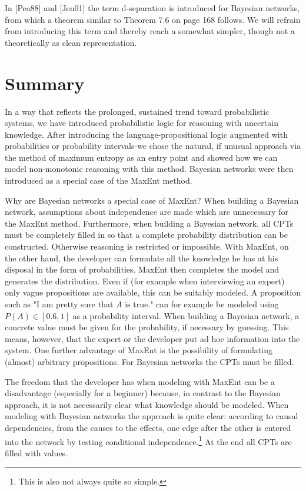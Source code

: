 \documentclass[10pt]{book}
\begin{document}
In [Pea88] and [Jen01] the term d-separation is introduced for Bayesian networks, from which a theorem similar to Theorem 7.6 on page 168 follows. We will refrain from introducing this term and thereby reach a somewhat simpler, though not a theoretically as clean representation.

\section{Summary}
In a way that reflects the prolonged, sustained trend toward probabilistic systems, we have introduced probabilistic logic for reasoning with uncertain knowledge. After introducing the language-propositional logic augmented with probabilities or probability intervals-we chose the natural, if unusual approach via the method of maximum entropy as an entry point and showed how we can model non-monotonic reasoning with this method. Bayesian networks were then introduced as a special case of the MaxEnt method.

Why are Bayesian networks a special case of MaxEnt? When building a Bayesian network, assumptions about independence are made which are unnecessary for the MaxEnt method. Furthermore, when building a Bayesian network, all CPTs must be completely filled in so that a complete probability distribution can be constructed. Otherwise reasoning is restricted or impossible. With MaxEnt, on the other hand, the developer can formulate all the knowledge he has at his disposal in the form of probabilities. MaxEnt then completes the model and generates the distribution. Even if (for example when interviewing an expert) only vague propositions are available, this can be suitably modeled. A proposition such as "I am pretty sure that $A$ is true." can for example be modeled using $P(A) \in[0.6,1]$ as a probability interval. When building a Bayesian network, a concrete value must be given for the probability, if necessary by guessing. This means, however, that the expert or the developer put ad hoc information into the system. One further advantage of MaxEnt is the possibility of formulating (almost) arbitrary propositions. For Bayesian networks the CPTs must be filled.

The freedom that the developer has when modeling with MaxEnt can be a disadvantage (especially for a beginner) because, in contrast to the Bayesian approach, it is not necessarily clear what knowledge should be modeled. When modeling with Bayesian networks the approach is quite clear: according to causal dependencies, from the causes to the effects, one edge after the other is entered into the network by testing conditional independence.\footnote{This is also not always quite so simple.} At the end all CPTs are filled with values.
\end{document}
